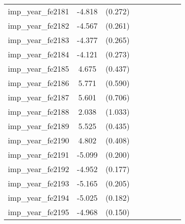 {\begin{tabular}{l*{4}{cc}}
imp\_year\_fe2181&   -4.818\sym{***}&  (0.272)&                  &         &                  &         &                  &         \\
imp\_year\_fe2182&   -4.567\sym{***}&  (0.261)&                  &         &                  &         &                  &         \\
imp\_year\_fe2183&   -4.377\sym{***}&  (0.265)&                  &         &                  &         &                  &         \\
imp\_year\_fe2184&   -4.121\sym{***}&  (0.273)&                  &         &                  &         &                  &         \\
imp\_year\_fe2185&    4.675\sym{***}&  (0.437)&                  &         &                  &         &                  &         \\
imp\_year\_fe2186&    5.771\sym{***}&  (0.590)&                  &         &                  &         &                  &         \\
imp\_year\_fe2187&    5.601\sym{***}&  (0.706)&                  &         &                  &         &                  &         \\
imp\_year\_fe2188&    2.038\sym{*}  &  (1.033)&                  &         &                  &         &                  &         \\
imp\_year\_fe2189&    5.525\sym{***}&  (0.435)&                  &         &                  &         &                  &         \\
imp\_year\_fe2190&    4.802\sym{***}&  (0.408)&                  &         &                  &         &                  &         \\
imp\_year\_fe2191&   -5.099\sym{***}&  (0.200)&                  &         &                  &         &                  &         \\
imp\_year\_fe2192&   -4.952\sym{***}&  (0.177)&                  &         &                  &         &                  &         \\
imp\_year\_fe2193&   -5.165\sym{***}&  (0.205)&                  &         &                  &         &                  &         \\
imp\_year\_fe2194&   -5.025\sym{***}&  (0.182)&                  &         &                  &         &                  &         \\
imp\_year\_fe2195&   -4.968\sym{***}&  (0.150)&                  &         &                  &         &                  &         \\

\end{tabular}}
